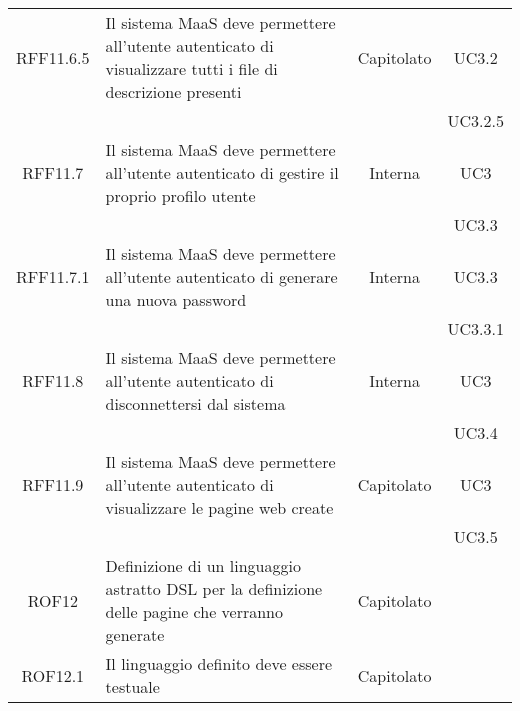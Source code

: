 \begin{longtable}{|c|p{6cm}|c|c|}
\midrule
RFF11.6.5
& Il sistema MaaS deve permettere all'utente autenticato di visualizzare tutti i file di descrizione presenti
& Capitolato
& UC3.2\\
& & & UC3.2.5\\

\midrule
RFF11.7
& Il sistema MaaS deve permettere all'utente autenticato di gestire il proprio profilo utente
& Interna
& UC3\\
& & & UC3.3\\

\midrule
RFF11.7.1
& Il sistema MaaS deve permettere all'utente autenticato di generare una nuova password
& Interna
& UC3.3\\
& & & UC3.3.1\\

\midrule
RFF11.8
& Il sistema MaaS deve permettere all'utente autenticato di disconnettersi dal sistema
& Interna
& UC3\\
& & & UC3.4\\

\midrule
RFF11.9
& Il sistema MaaS deve permettere all'utente autenticato di visualizzare le pagine web create
& Capitolato
& UC3\\
& & & UC3.5\\

\midrule
ROF12
& Definizione di un linguaggio astratto DSL per la definizione delle pagine che verranno generate
& Capitolato
&
\\

\midrule
ROF12.1
& Il linguaggio definito deve essere testuale
& Capitolato
&
\\

\end{longtable}
\newpage
